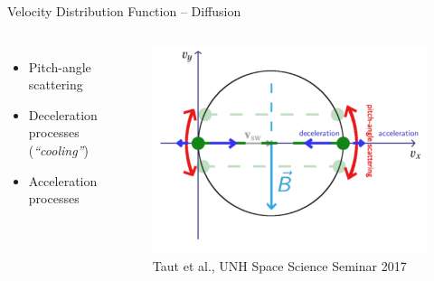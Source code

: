 \documentclass{beamer}
\begin{document}
\begin{frame}{Velocity Distribution Function -- Diffusion} %
\begin{columns}
	\column{5cm}
		\begin{itemize}
			\item Pitch-angle scattering 
			\vspace{1cm}
			\item Deceleration processes (\textit{``cooling''})
			\vspace{1cm}
			\item Acceleration processes
		\end{itemize}
	\column{7.5cm}
		\begin{figure}
			\includegraphics[scale=0.25]{pictures/mods2.pdf}
			\caption{\scriptsize{Taut et al., UNH Space Science Seminar 2017}}
		\end{figure}
\end{columns}
\end{frame}
\end{document}
